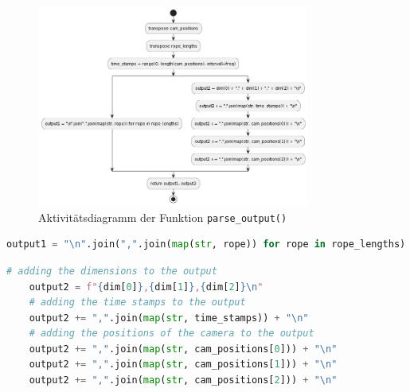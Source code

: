 \begin{figure}[H]
    \centering
    \includegraphics[width=0.8\textwidth]{../python/uml/activity_parse_output_simplified.png}
    \caption{Aktivitätsdiagramm der Funktion \texttt{parse\_output()}}
    \label{fig:activity_parse_output}
\end{figure}

\begin{lstlisting}[caption={Erstellung der Ausgabedatei 1 (Längen der Drahtseile)}, label={lst:parse_output1}, language=Python]
    output1 = "\n".join(",".join(map(str, rope)) for rope in rope_lengths)
\end{lstlisting}

\begin{lstlisting}[caption={Erstellung der Ausgabedatei 2 (Kamerapositionen)}, label={lst:parse_output2}, language=Python]
    # adding the dimensions to the output
    output2 = f"{dim[0]},{dim[1]},{dim[2]}\n"
    # adding the time stamps to the output
    output2 += ",".join(map(str, time_stamps)) + "\n"
    # adding the positions of the camera to the output
    output2 += ",".join(map(str, cam_positions[0])) + "\n"
    output2 += ",".join(map(str, cam_positions[1])) + "\n"
    output2 += ",".join(map(str, cam_positions[2])) + "\n"
\end{lstlisting}
